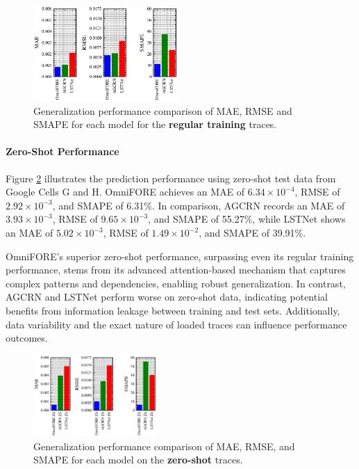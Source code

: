 \documentclass{ieeetmlcn}
\begin{document}
\begin{figure}%
\centering
\includegraphics[width=0.49\textwidth]{img/metrics_comparison_regular.eps}
\caption{Generalization performance comparison of MAE, RMSE and SMAPE for each model for the \textbf{regular training} traces.}
\label{fig:metrics_comparison_regular}
\end{figure}

\paragraph*{Zero-Shot Performance}
Figure \ref{fig:metrics_comparison_ZS} illustrates the prediction performance using zero-shot test data from Google Cells G and H. OmniFORE achieves an MAE of $6.34 \times 10^{-4}$, RMSE of $2.92 \times 10^{-3}$, and SMAPE of 6.31\%. In comparison, AGCRN records an MAE of $3.93 \times 10^{-3}$, RMSE of $9.65 \times 10^{-3}$, and SMAPE of 55.27\%, while LSTNet shows an MAE of $5.02 \times 10^{-3}$, RMSE of $1.49 \times 10^{-2}$, and SMAPE of 39.91\%.

OmniFORE's superior zero-shot performance, surpassing even its regular training performance, stems from its advanced attention-based mechanism that captures complex patterns and dependencies, enabling robust generalization. In contrast, AGCRN and LSTNet perform worse on zero-shot data, indicating potential benefits from information leakage between training and test sets. Additionally, data variability and the exact nature of loaded traces can influence performance outcomes.

\begin{figure}%
\centering
\includegraphics[width=0.42\textwidth]{img/metrics_comparison_zs.eps}
\caption{Generalization performance comparison of MAE, RMSE, and SMAPE for each model on the \textbf{zero-shot} traces.}
\label{fig:metrics_comparison_ZS}
\end{figure}
\end{document}
